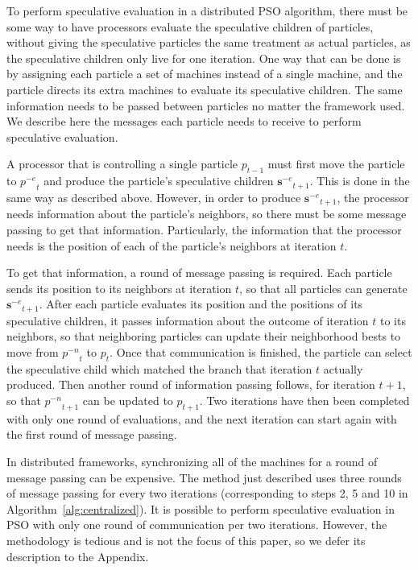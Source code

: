 \documentclass[smallcondensed]{svjour3}
\newcommand{\alg}[1]{Algorithm~\ref{alg:#1}}
\providecommand{\noeval}[1]{\ensuremath{#1^{-e}}}
\providecommand{\nonbest}[1]{\ensuremath{#1^{-n}}}
\providecommand{\p}{\ensuremath{p}}
\providecommand{\sset}{\ensuremath{\mathbf{s}}}
\begin{document}
To perform speculative evaluation in a distributed PSO algorithm, there must be
some way to have processors evaluate the speculative children of particles,
without giving the speculative particles the same treatment as actual
particles, as the speculative children only live for one iteration.  One way
that can be done is by assigning each particle a set of machines instead of a
single machine, and the particle directs its extra machines to evaluate its
speculative children.  The same information needs to be passed between
particles no matter the framework used.  We describe here the messages each
particle needs to receive to perform speculative evaluation.

A processor that is controlling a single particle $\p_{t-1}$ must first move
the particle to $\noeval{\p}_t$ and produce the particle's speculative children
$\noeval{\sset}_{t+1}$.  This is done in the same way as described above.
However, in order to produce $\noeval{\sset}_{t+1}$, the processor needs
information about the particle's neighbors, so there must be some message
passing to get that information.  Particularly, the information that the
processor needs is the position of each of the particle's neighbors at
iteration $t$.

To get that information, a round of message passing is required.  Each particle
sends its position to its neighbors at iteration $t$, so that all particles can
generate $\noeval{\sset}_{t+1}$.  After each particle evaluates its position
and the positions of its speculative children, it passes information about the
outcome of iteration $t$ to its neighbors, so that neighboring particles can
update their neighborhood bests to move from $\nonbest{\p}_t$ to $\p_t$.  Once
that communication is finished, the particle can select the speculative child
which matched the branch that iteration $t$ actually produced.  Then another
round of information passing follows, for iteration $t+1$, so that
$\nonbest{\p}_{t+1}$ can be updated to $\p_{t+1}$.  Two iterations have then
been completed with only one round of evaluations, and the next iteration can
start again with the first round of message passing.

In distributed frameworks, synchronizing all of the machines for a round of
message passing can be expensive.  The method just described uses three rounds
of message passing for every two iterations (corresponding to steps 2, 5 and 10
in \alg{centralized}).  It is possible to perform speculative evaluation in PSO
with only one round of communication per two iterations.  However, the
methodology is tedious and is not the focus of this paper, so we defer its
description to the Appendix.
\end{document}
